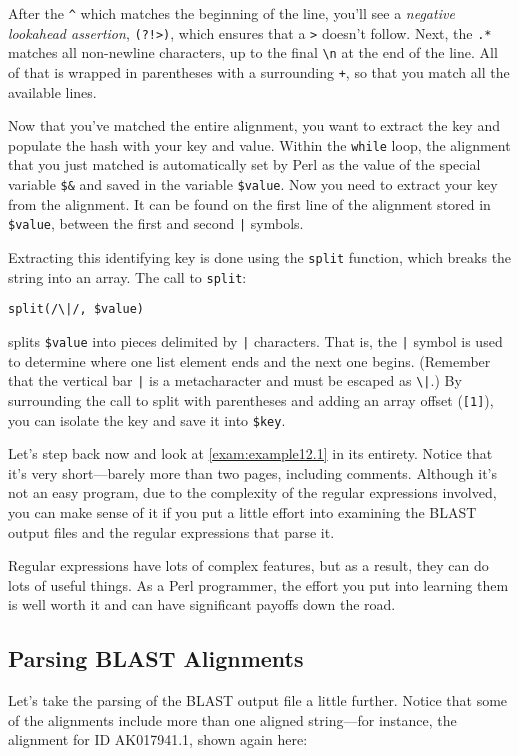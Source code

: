 After the \verb|^| which matches the beginning of the line, you'll see a \textit{negative lookahead assertion}, \verb|(?!>)|, which ensures that a \verb|>| doesn't follow. Next, the \verb|.*| matches all non-newline characters, up to the final \verb|\n| at the end of the line. All of that is wrapped in parentheses with a surrounding \verb|+|, so that you match all the available lines.

Now that you've matched the entire alignment, you want to extract the key and populate the hash with your key and value. Within the \verb|while| loop, the alignment that you just matched is automatically set by Perl as the value of the special variable \verb|$&| and saved in the variable \verb|$value|. Now you need to extract your key from the alignment. It can be found on the first line of the alignment stored in \verb|$value|, between the first and second \verb=|= symbols.

Extracting this identifying key is done using the \verb|split| function, which
breaks the string into an array. The call to \verb|split|: 

\begin{lstlisting}
split(/\|/, $value)
\end{lstlisting}

splits \verb|$value| into pieces delimited by \verb=|= characters. That is, the \verb=|= symbol is used to determine where one list element ends and the next one begins. (Remember that the vertical bar \verb=|= is a metacharacter and must be escaped as \verb=\|=.) By surrounding the call to split with parentheses and adding an array offset (\verb|[1]|), you can isolate the key and save it into \verb|$key|.

Let's step back now and look at \autoref{exam:example12.1} in its entirety. Notice that it's very short—barely more than two pages, including comments.  Although it's not an easy program, due to the complexity of the regular expressions involved, you can make sense of it if you put a little effort into examining the BLAST output files and the regular expressions that parse it.

Regular expressions have lots of complex features, but as a result, they can do lots of useful things. As a Perl programmer, the effort you put into learning them is well worth it and can have significant payoffs down the road. 

\subsection{Parsing BLAST Alignments}
Let's take the parsing of the BLAST output file a little further. Notice that some of the alignments include more than one aligned string—for instance, the alignment for ID AK017941.1, shown again here: 

